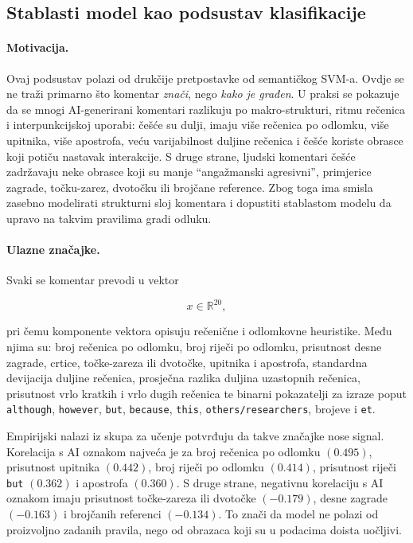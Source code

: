 \subsection{Stablasti model kao podsustav klasifikacije}

\paragraph{Motivacija.}
Ovaj podsustav polazi od drukčije pretpostavke od semantičkog SVM-a. Ovdje se ne traži primarno što komentar \emph{znači}, nego \emph{kako je građen}. U praksi se pokazuje da se mnogi AI-generirani komentari razlikuju po makro-strukturi, ritmu rečenica i interpunkcijskoj uporabi: češće su dulji, imaju više rečenica po odlomku, više upitnika, više apostrofa, veću varijabilnost duljine rečenica i češće koriste obrasce koji potiču nastavak interakcije. S druge strane, ljudski komentari češće zadržavaju neke obrasce koji su manje ``angažmanski agresivni'', primjerice zagrade, točku-zarez, dvotočku ili brojčane reference. Zbog toga ima smisla zasebno modelirati strukturni sloj komentara i dopustiti stablastom modelu da upravo na takvim pravilima gradi odluku.

\paragraph{Ulazne značajke.}
Svaki se komentar prevodi u vektor

\[
x \in \mathbb{R}^{20},
\]

pri čemu komponente vektora opisuju rečenične i odlomkovne heuristike. Među njima su: broj rečenica po odlomku, broj riječi po odlomku, prisutnost desne zagrade, crtice, točke-zareza ili dvotočke, upitnika i apostrofa, standardna devijacija duljine rečenica, prosječna razlika duljina uzastopnih rečenica, prisutnost vrlo kratkih i vrlo dugih rečenica te binarni pokazatelji za izraze poput \texttt{although}, \texttt{however}, \texttt{but}, \texttt{because}, \texttt{this}, \texttt{others/researchers}, brojeve i \texttt{et}.

Empirijski nalazi iz skupa za učenje potvrđuju da takve značajke nose signal. Korelacija s AI oznakom najveća je za broj rečenica po odlomku $(0.495)$, prisutnost upitnika $(0.442)$, broj riječi po odlomku $(0.414)$, prisutnost riječi \texttt{but} $(0.362)$ i apostrofa $(0.360)$. S druge strane, negativnu korelaciju s AI oznakom imaju prisutnost točke-zareza ili dvotočke $(-0.179)$, desne zagrade $(-0.163)$ i brojčanih referenci $(-0.134)$. To znači da model ne polazi od proizvoljno zadanih pravila, nego od obrazaca koji su u podacima doista uočljivi.


